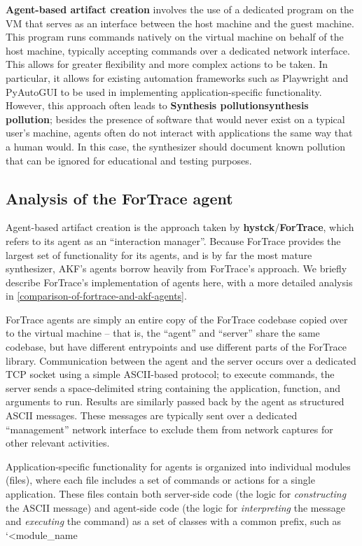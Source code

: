 \documentclass[letterpaper,12pt]{report}
\begin{document}
\textbf{Agent-based artifact creation} involves the use of a dedicated
program on the VM that serves as an interface between the host machine
and the guest machine. This program runs commands natively on the
virtual machine on behalf of the host machine, typically accepting
commands over a dedicated network interface. This allows for greater
flexibility and more complex actions to be taken. In particular, it
allows for existing automation frameworks such as Playwright and
PyAutoGUI to be used in implementing application-specific functionality.
However, this approach often leads to \textbf{Synthesis
pollution\textbar synthesis pollution}; besides the presence of software
that would never exist on a typical user's machine, agents often do not
interact with applications the same way that a human would. In this
case, the synthesizer should document known pollution that can be
ignored for educational and testing purposes.

\subsection{Analysis of the ForTrace
agent}\label{analysis-of-the-fortrace-agent}

Agent-based artifact creation is the approach taken by
\textbf{hystck}/\textbf{ForTrace}, which refers to its agent as an
``interaction manager''. Because ForTrace provides the largest set of
functionality for its agents, and is by far the most mature synthesizer,
AKF's agents borrow heavily from ForTrace's approach. We briefly
describe ForTrace's implementation of agents here, with a more detailed
analysis in \autoref{comparison-of-fortrace-and-akf-agents}.

ForTrace agents are simply an entire copy of the ForTrace codebase
copied over to the virtual machine -- that is, the ``agent'' and
``server'' share the same codebase, but have different entrypoints and
use different parts of the ForTrace library. Communication between the
agent and the server occurs over a dedicated TCP socket using a simple
ASCII-based protocol; to execute commands, the server sends a
space-delimited string containing the application, function, and
arguments to run. Results are similarly passed back by the agent as
structured ASCII messages. These messages are typically sent over a
dedicated ``management'' network interface to exclude them from network
captures for other relevant activities.

Application-specific functionality for agents is organized into
individual modules (files), where each file includes a set of commands
or actions for a single application. These files contain both
server-side code (the logic for \emph{constructing} the ASCII message)
and agent-side code (the logic for \emph{interpreting} the message and
\emph{executing} the command) as a set of classes with a common prefix,
such as `\textless module\_name
\end{document}

